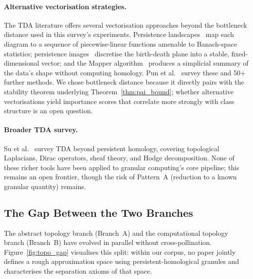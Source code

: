 \paragraph{Alternative vectorisation strategies.}
The TDA literature offers several vectorisation approaches beyond the
bottleneck distance used in this survey's experiments.  Persistence
landscapes~\cite{Bubenik2015landscapes} map each diagram to a sequence of
piecewise-linear functions amenable to Banach-space statistics; persistence
images~\cite{Adams2017persistence} discretise the birth-death plane into a
stable, fixed-dimensional vector; and the Mapper
algorithm~\cite{Singh2007mapper} produces a simplicial summary of the data's
shape without computing homology.  Pun et al.~\cite{Pun2022PH} survey these
and 50+ further methods.  We chose bottleneck distance because it directly
pairs with the stability theorem underlying Theorem~\ref{thm:pai_bound};
whether alternative vectorisations yield importance scores that correlate
more strongly with class structure is an open question.

\paragraph{Broader TDA survey.}
Su et al.~\cite{Su2025TDA} survey TDA beyond persistent homology, covering
topological Laplacians, Dirac operators, sheaf theory, and Hodge
decomposition.  None of these richer tools have been applied to granular
computing's core pipeline; this remains an open frontier, though
the risk of Pattern~A (reduction to a known granular quantity) remains.

\subsection{The Gap Between the Two Branches}
\label{sec:topo_gap}

The abstract topology branch (Branch~A) and the computational topology
branch (Branch~B) have evolved in parallel without cross-pollination.
Figure~\ref{fig:topo_gap} visualises this split: within our corpus, no paper
jointly defines a rough approximation space using persistent-homological
granules and characterises the separation axioms of that space.

